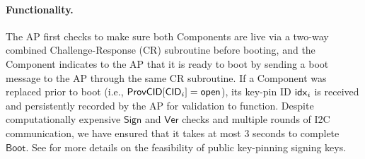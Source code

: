
\paragraph{Functionality.} The AP first checks to make sure both Components are live via a two-way combined Challenge-Response (CR) subroutine before booting, and the Component indicates to the AP that it is ready to boot by sending a boot message to the AP through the same CR subroutine. If a Component was replaced prior to boot (i.e., $\mathsf{ProvCID}[\mathsf{CID}_i] = \mathsf{open}$), its key-pin ID $\mathsf{idx}_i$ is received and persistently recorded by the AP for validation to function. Despite computationally expensive $\mathsf{Sign}$ and $\mathsf{Ver}$ checks and multiple rounds of I2C communication, we have ensured that it takes at most 3 seconds to complete $\mathsf{Boot}$. See  for more details on the feasibility of public key-pinning signing keys.


